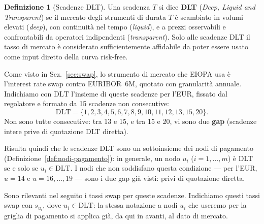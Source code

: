 \documentclass[11pt,a4paper]{article}
\theoremstyle{plain}
\theoremstyle{definition}
\newtheorem{definizione}[teorema]{Definizione}
\theoremstyle{remark}
\newcommand{\DLT}{\mathrm{DLT}}
\begin{document}
\begin{definizione}[Scadenze DLT]
\label{def:dlt}
Una scadenza $T$ si dice \textbf{DLT} (\emph{Deep, Liquid and Transparent}) se il mercato
degli strumenti di durata $T$ \`e scambiato in volumi elevati (\emph{deep}), con continuit\`a
nel tempo (\emph{liquid}), e a prezzi osservabili e confrontabili da operatori indipendenti
(\emph{transparent}). Solo alle scadenze DLT il tasso di mercato \`e considerato
sufficientemente affidabile da poter essere usato come input diretto della curva risk-free.

\end{definizione}

Come visto in Sez.~\ref{sec:swap}, lo strumento di mercato che EIOPA usa \`e l'interest rate
swap contro EURIBOR~6M, quotato con granularit\`a annuale. Indichiamo con $\DLT$ l'insieme di
queste scadenze per l'EUR, fissato dal regolatore e formato da 15 scadenze non consecutive:
\[
  \DLT = \{1,2,3,4,5,6,7,8,9,10,11,12,13,15,20\}.
\]
Non sono tutte consecutive: tra 13 e 15, e tra 15 e 20, vi sono due \textbf{gap} (scadenze
intere prive di quotazione DLT diretta).

Risulta quindi che le scadenze DLT sono un sottoinsieme dei nodi di pagamento
(Definizione~\ref{def:nodi-pagamento}): in generale, un nodo $u_i$ ($i=1,\ldots,m$) \`e DLT se
e solo se $u_i\in\DLT$. I nodi che non soddisfano questa condizione --- per l'EUR, $u=14$ e
$u=16,\ldots,19$ --- sono i due gap gi\`a visti: privi di quotazione diretta.

Sono rilevanti nel seguito i tassi swap per queste scadenze. Indichiamo questi tassi swap con
$s_{u_i}$, dove $u_i\in\DLT$: la stessa notazione a nodi $u_i$ che useremo per la griglia di
pagamento si applica gi\`a, da qui in avanti, al dato di mercato.
\end{document}
